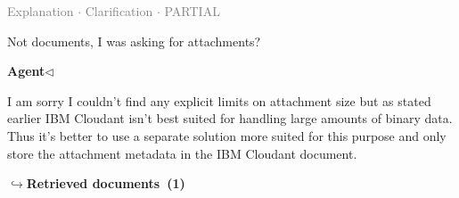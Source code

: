 \documentclass[a4paper,11pt]{article}
\begin{document}
\vspace{0.5em}
\hfill{\tiny\textcolor{gray}{Explanation $\cdot$ Clarification $\cdot$ PARTIAL}}
\begin{userbubble}
Not documents, I was asking for attachments?
\end{userbubble}
\noindent\hfill{\small\textcolor{agentcolor}{\textbf{Agent\enspace$\triangleleft$}}}
\begin{agentbubble}
I am sorry I couldn't find any explicit limits on attachment size but as stated earlier IBM Cloudant isn't best suited for handling large amounts of binary data. Thus it’s better to use a separate solution more suited for this purpose and only store the attachment metadata in the IBM Cloudant document.
\end{agentbubble}
\noindent\hfill{\footnotesize\textcolor{doccolor}{\textbf{$\hookrightarrow$\enspace Retrieved documents~(1)}}}
\end{document}
